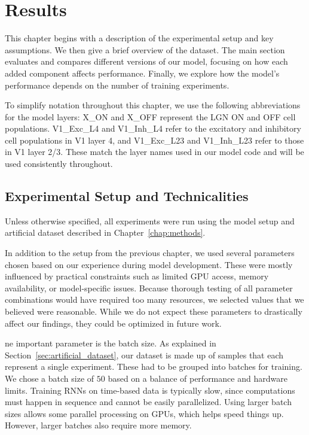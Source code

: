 \chapter{Results}
\label{chap:results}

This chapter begins with a description of the experimental setup and key assumptions. We then give a brief overview of the dataset. The main section evaluates and compares different versions of our model, focusing on how each added component affects performance. Finally, we explore how the model's performance depends on the number of training experiments.

To simplify notation throughout this chapter, we use the following abbreviations for the model layers: X\_ON and X\_OFF represent the LGN ON and OFF cell populations. V1\_Exc\_L4 and V1\_Inh\_L4 refer to the excitatory and inhibitory cell populations in V1 layer 4, and V1\_Exc\_L23 and V1\_Inh\_L23 refer to those in V1 layer 2/3. These match the layer names used in our model code and will be used consistently throughout.

\section{Experimental Setup and Technicalities}
\label{sec:experimental_setup}

Unless otherwise specified, all experiments were run using the model setup and artificial dataset described in Chapter~\ref{chap:methods}.

In addition to the setup from the previous chapter, we used several parameters chosen based on our experience during model development. These were mostly influenced by practical constraints such as limited GPU access, memory availability, or model-specific issues. Because thorough testing of all parameter combinations would have required too many resources, we selected values that we believed were reasonable. While we do not expect these parameters to drastically affect our findings, they could be optimized in future work.

ne important parameter is the batch size. As explained in Section~\ref{sec:artificial_dataset}, our dataset is made up of samples that each represent a single experiment. These had to be grouped into batches for training. We chose a batch size of $50$ based on a balance of performance and hardware limits. Training RNNs on time-based data is typically slow, since computations must happen in sequence and cannot be easily parallelized. Using larger batch sizes allows some parallel processing on GPUs, which helps speed things up. However, larger batches also require more memory.


